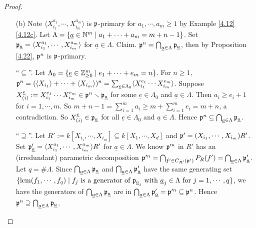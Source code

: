 \begin{proof}
    \begin{enumerate}
        \item[(b)]
            Note $\langle X_{i_1}^{a_1},\cdots,X_{i_m}^{a_m} \rangle$ is $\mathfrak{p}$-primary for $a_1,\cdots,a_m \geq 1$ by Example \ref{4.12}\ref{4.12c}. Let $\Lambda = \{\underline a \in \mathbb{N}^{m} \mid a_1 + \cdots + a_m = m+n-1\}$. Set $\mathfrak{p}_{\underline a} = \langle X_{i_1}^{a_1},\cdots,X_{i_m}^{a_m} \rangle$ for $\underline a \in \Lambda$. Claim. $\mathfrak{p}^{n} = \bigcap_{\underline a \in \Lambda} \mathfrak{p}_{\underline a}$, then by Proposition \ref{4.22}, $\mathfrak{p}^{n}$ is $\mathfrak{p}$-primary. \par
            ``$\subseteq$''. Let $\Lambda_0 = \{\underline e \in \mathbb{Z}_{\geq 0}^{m} \mid e_1 + \cdots + e_m = n\}$. For $n \geq 1$, $\mathfrak{p}^{n} = (\langle X_{i_1} \rangle + \cdots + \langle X_{i_m} \rangle)^{n} = \sum_{\underline e \in \Lambda_0} \langle X_{i_1}^{e_1} \cdots X_{i_m}^{e_m} \rangle$. Suppose $X_{(i)}^{\underline e} := X_{i_1}^{e_1} \cdots X_{i_m}^{e_m} \in \mathfrak{p}^{n} \smallsetminus \mathfrak{p}_{\underline a}$ for some $\underline e \in \Lambda_0$ and $\underline a \in \Lambda$. Then $a_i \geq e_i+1$ for $i = 1,\cdots,m$. So $m+n-1 = \sum_{i=1}^{m}a_i \geq m + \sum_{i=1}^{m}e_i = m+n$, a contradiction. So $X^{\underline e}_{(i)} \in \mathfrak{p}_{\underline a}$ for all $\underline e \in \Lambda_0$ and $\underline a \in \Lambda$. Hence $\mathfrak{p}^{n} \subseteq \bigcap_{\underline a \in \Lambda} \mathfrak{p}_{\underline a}$. \par 
        ``$\supseteq$''. Let $R' := k[X_{i_1},\cdots,X_{i_m}] \subseteq k[X_1,\cdots,X_d]$ and $\mathfrak{p}' = (X_{i_1},\cdots,X_{i_m})R'$. Set $\mathfrak{p}'_{\underline a} = \langle X_{i_1}^{a_1},\cdots,X_{i_m}^{a_m} \rangle R'$ for $\underline a \in \Lambda$. We know $\mathfrak{p}'^{n}$ in $R'$ has an (irredundant) parametric decomposition $\mathfrak{p}'^{n} = \bigcap_{f' \in C_{R'}(\mathfrak{p}')} P_R(f') = \bigcap_{\underline a \in \Lambda} \mathfrak{p}'_{\underline a}$. Let $q = \# \Lambda$. Since $\bigcap_{\underline a \in \Lambda} \mathfrak{p}_{\underline a}$ and $\bigcap_{\underline a \in \Lambda} \mathfrak{p}'_{\underline a}$ have the same generating set $\{\operatorname{lcm}(f_1,\cdots,f_q) \mid f_j \text{ is a generator of $\mathfrak{p}_{\underline a_j}$ with $\underline a_j \in \Lambda$ for $j=1,\cdots,q$}\}$, we have the generators of $\bigcap_{\underline a \in \Lambda} \mathfrak{p}_{\underline a}$ are in $\bigcap_{\underline a \in \Lambda} \mathfrak{p}_{\underline a}' = \mathfrak{p}'^{n} \subseteq \mathfrak{p}^{n}$. Hence $\mathfrak{p}^{n} \supseteq \bigcap_{\underline a \in \Lambda} \mathfrak{p}_{\underline a}$. \qedhere
    \end{enumerate}
\end{proof}

